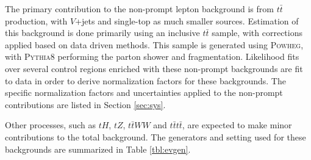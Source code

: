 The primary contribution to the non-prompt lepton background is from $t\bar{t}$ production, with $V$+jets and single-top as much smaller sources. Estimation of this background is done primarily using an inclusive $t\bar{t}$ sample, with corrections applied based on data driven methods. This sample is generated using \textsc{Powheg}, with \textsc{Pythia8} performing the parton shower and fragmentation. Likelihood fits over several control regions enriched with these non-prompt backgrounds are fit to data in order to derive normalization factors for these backgrounds. The specific normalization factors and uncertainties applied to the non-prompt contributions are listed in Section \ref{sec:sys}.

Other processes, such as $tH$, $tZ$, $t\bar{t}WW$ and $t\bar{t}t\bar{t}$, are expected to make minor contributions to the total background. The generators and setting used for these backgrounds are summarized in Table \ref{tbl:evgen}.

